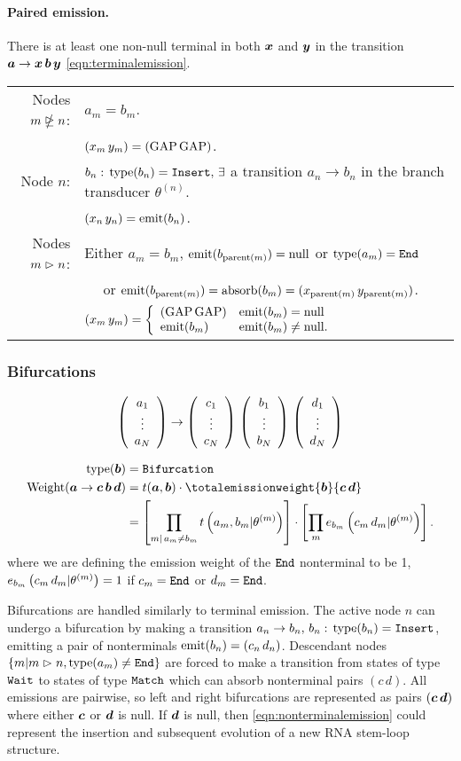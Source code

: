 \documentclass[10pt]{article}
\begin{document}
\paragraph{Paired emission.}

There is at least one non-null terminal in both $\bvec{x}$ and $\bvec{y}$ in the transition $\bvec{a} \to \bvec{x}\,\bvec{b}\,\bvec{y}$ \eqref{eqn:terminalemission}.

\begin{tabular}{rl}
  Nodes $\mNDEn$: & $a_m = b_m$. \\
  & $(x_m\,y_m) = (\Tgap\,\Tgap)$. \\
  Node $n$: & $b_n:\,\type(b_n) = \Sinsert,\,\exists$ a transition $a_n \to b_n$ in the branch transducer $\theta^{(n)}$. \\
  & $(x_n\,y_n) = \emit(b_n)$. \\
  Nodes $\mDn$: & Either $a_m = b_m$, $\emit(b_{\parent(m)}) = \Tnull$ or $\type(a_m) = \Send$ \\
  & $\quad$ or $\emit(b_{\parent(m)}) = \absorb(b_m) = (x_{\parent(m)}\,y_{\parent(m)})$. \\
  & $(x_m\,y_m) = \left\{ \begin{array}{ll} (\Tgap\,\Tgap) & \emit(b_m) = \Tnull \\ \emit(b_m) & \emit(b_m) \ne \Tnull . \end{array} \right. $
\end{tabular}


\subsubsection*{Bifurcations}
\[ \statevec{a} \to \statevec{c}\,\statevec{b}\,\statevec{d} \]

\begin{align} \label{eqn:nonterminalemission}
  \type(\bvec{b}) &= \Sbifurc \\
  \weight(\bvec{a}\to\bvec{c}\,\bvec{b}\,\bvec{d}) &=  t(\bvec{a},\bvec{b}) \cdot \totalemissionweight{\bvec{b}}{\bvec{c}\,\bvec{d}} \\
  &= \left[ \prod_{m|\,a_m \ne b_m} \transweight{m}{a_m}{b_m} \right] \cdot \left[ \prod_m \emissionweight{m}{b_m}{c_m\,d_m} \right] .
\end{align}
where we are defining the emission weight of the $\Send$ nonterminal to be 1, $\emissionweight{m}{b_m}{c_m\,d_m} = 1$ if $c_m = \Send$ or $d_m = \Send$.

Bifurcations are handled similarly to terminal emission.  The active node $n$ can undergo a bifurcation by making a transition 
$a_n \to b_n,\, b_n:\,\type(b_n) = \Sinsert$, emitting a pair of nonterminals $\emit(b_n) = (c_n\,d_n)$.  Descendant nodes $\{m|\mDn,\type(a_m) \ne \Send\}$
are forced to make a transition from states of type $\Swait$ to states of type $\Smatch$ which can absorb nonterminal pairs $(c\,d)$.
All emissions are pairwise, so left and right bifurcations are represented as pairs $(\bvec{c}\,\bvec{d})$ where either $\bvec{c}$ or $\bvec{d}$ is null.
If $\bvec{d}$ is null, then \eqref{eqn:nonterminalemission} could represent the insertion and subsequent evolution of a new RNA stem-loop structure.
\end{document}
